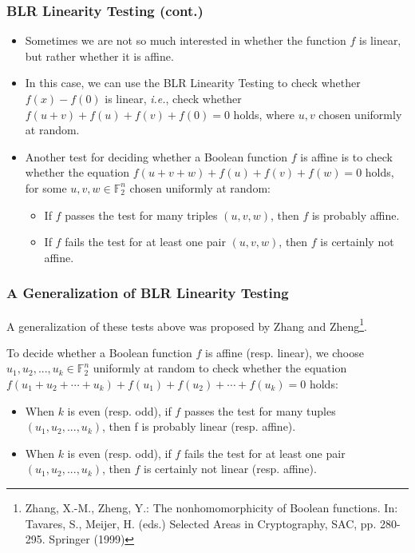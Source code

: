 \documentclass[
    aspectratio=169,                   %
]{beamer}
\newcommand{\F}{\mathbb{F}}
\begin{document}
    \begin{frame}
        \frametitle{BLR Linearity Testing (cont.)}
        \begin{itemize}
            \item Sometimes we are not so much interested in whether the function $f$ is linear, but rather whether it is affine.     
            \item In this case, we can use the BLR Linearity Testing to check whether $f(x)-f(0)$ is linear, \emph{i.e.}, check whether $f (u + v) + f (u) + f (v) + f (0) = 0$ holds, where $u,v$ chosen uniformly at random.
            \item Another test for deciding whether a Boolean function $f$ is affine is to 
            check whether the equation $f (u + v + w) + f (u) + f (v) + f (w) = 0$ holds, for some $u, v, w\in\F_2^n$ chosen uniformly at random:
            \begin{itemize}
                \item If $f$ passes the test for many triples $(u, v, w)$, then $f$ is probably affine.
                \item If $f$ fails the test for at least one pair $(u, v, w)$, then $f$ is certainly not affine. 
            \end{itemize}
        \end{itemize}
            
    \end{frame}

    \begin{frame}
        \frametitle{A Generalization of BLR Linearity Testing}
    
        A generalization of these tests above was proposed by Zhang and Zheng\footnote{Zhang, X.-M., Zheng, Y.: The nonhomomorphicity of Boolean functions. In: Tavares, S., Meijer,
        H. (eds.) Selected Areas in Cryptography, SAC, pp. 280-295. Springer (1999)}.

        To decide whether a Boolean function $f$ is affine (resp. linear), we choose $u_1,u_2,...,u_k\in\F_2^n$ uniformly at random to check whether the equation $f (u_1 +u_2+\cdots + u_k) + f (u_1) + f(u_2)+\cdots + f (u_k) = 0$ holds:
        \begin{itemize}
            \item When $k$ is even (resp. odd), if $f$ passes the test for many tuples $(u_1,u_2,...,u_k)$, then f is probably linear (resp. affine).
            \item When $k$ is even (resp. odd), if $f$ fails the test for at least one pair $(u_1,u_2,...,u_k)$, then $f$ is certainly not linear (resp. affine).
        \end{itemize}
            
    \end{frame}
    
\end{document}
